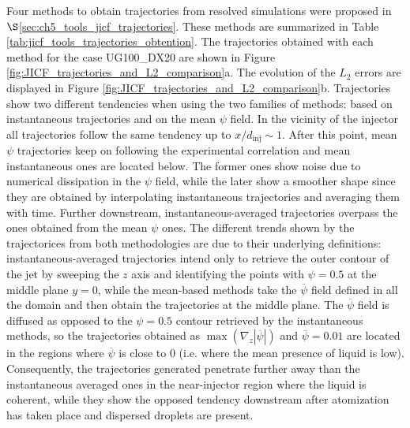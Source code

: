 Four methods to obtain trajectories from resolved simulations were proposed in $\S$\ref{sec:ch5_tools_jicf_trajectories}. These methods are summarized in Table \ref{tab:jicf_tools_trajectories_obtention}. The trajectories obtained with each method for the case UG100\_DX20 are shown in Figure \ref{fig:JICF_trajectories_and_L2_comparison}a. The evolution of the $L_2$ errors are displayed in Figure \ref{fig:JICF_trajectories_and_L2_comparison}b. Trajectories show two different tendencies when using the two families of methods: based on instantaneous trajectories and on the mean $\psi$ field. In the vicinity of the injector all trajectories follow the same tendency up to $x/d_\mathrm{inj} \sim 1$. After this point, mean $\psi$ trajectories keep on following the experimental correlation and mean instantaneous ones are located below. The former ones show noise due to numerical dissipation in the $\psi$ field, while the later show a smoother shape since they are obtained by interpolating instantaneous trajectories and averaging them with time. Further downstream, instantaneous-averaged trajectories overpass the ones obtained from the mean $\psi$ ones. The different trends shown by the trajectorices from both methodologies are due to their underlying definitions: instantaneous-averaged trajectories intend only to retrieve the outer contour of the jet by sweeping the $z$ axis and identifying the points with $\psi = 0.5$ at the middle plane $y = 0$, while the mean-based methods take the $\overline{\psi}$ field defined in all the domain and then obtain the trajectories at the middle plane. The $\overline{\psi}$ field is diffused as opposed to the $\psi = 0.5$ contour retrieved by the instantaneous methods, so the trajectories obtained as $\max \left( \nabla_z | \overline{\psi} | \right)$ and $\overline{\psi} = 0.01$ are located in the regions where $\overline{\psi}$ is close to $0$ (i.e. where the mean presence of liquid is low). Consequently, the trajectories generated penetrate further away than the instantaneous averaged ones in the near-injector region where the liquid is coherent, while they show the opposed tendency downstream after atomization has taken place and dispersed droplets are present.


